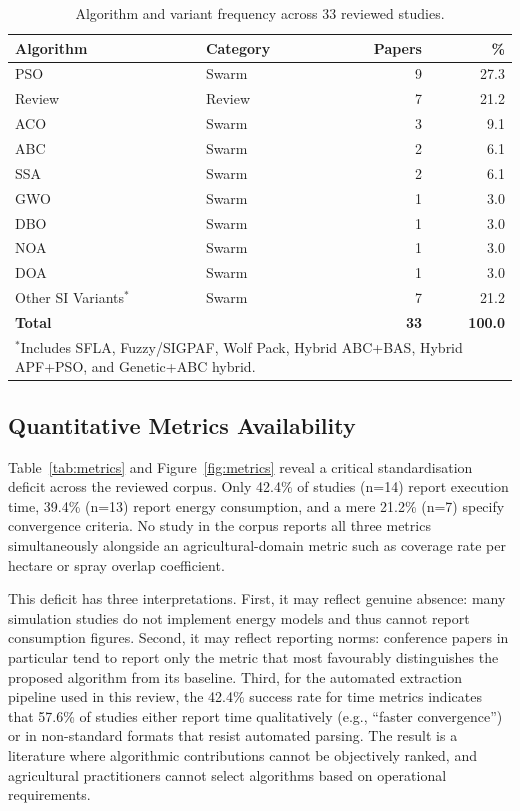 \documentclass[review,3p,times]{elsarticle}
\begin{document}
\begin{table}[htbp]
\centering
\caption{Algorithm and variant frequency across 33 reviewed studies.}
\label{tab:algorithms}
\begin{tabular}{llrr}
\toprule
\textbf{Algorithm} & \textbf{Category} & \textbf{Papers} & \textbf{\%} \\
\midrule
PSO & Swarm & 9 & 27.3 \\
Review & Review & 7 & 21.2 \\
ACO & Swarm & 3 & 9.1 \\
ABC & Swarm & 2 & 6.1 \\
SSA & Swarm & 2 & 6.1 \\
GWO & Swarm & 1 & 3.0 \\
DBO & Swarm & 1 & 3.0 \\
NOA & Swarm & 1 & 3.0 \\
DOA & Swarm & 1 & 3.0 \\
Other SI Variants$^*$ & Swarm & 7 & 21.2 \\
\midrule
\textbf{Total} & & \textbf{33} & \textbf{100.0} \\
\bottomrule
\multicolumn{4}{l}{$^*$Includes SFLA, Fuzzy/SIGPAF, Wolf Pack, Hybrid ABC+BAS, Hybrid APF+PSO, and Genetic+ABC hybrid.}
\end{tabular}
\end{table}

\subsection{Quantitative Metrics Availability}
Table~\ref{tab:metrics} and Figure~\ref{fig:metrics} reveal a critical standardisation deficit across the reviewed corpus. Only 42.4\% of studies (n=14) report execution time, 39.4\% (n=13) report energy consumption, and a mere 21.2\% (n=7) specify convergence criteria. No study in the corpus reports all three metrics simultaneously alongside an agricultural-domain metric such as coverage rate per hectare or spray overlap coefficient.

This deficit has three interpretations. First, it may reflect genuine absence: many simulation studies do not implement energy models and thus cannot report consumption figures. Second, it may reflect reporting norms: conference papers in particular tend to report only the metric that most favourably distinguishes the proposed algorithm from its baseline. Third, for the automated extraction pipeline used in this review, the 42.4\% success rate for time metrics indicates that 57.6\% of studies either report time qualitatively (e.g., ``faster convergence'') or in non-standard formats that resist automated parsing. The result is a literature where algorithmic contributions cannot be objectively ranked, and agricultural practitioners cannot select algorithms based on operational requirements.
\end{document}
